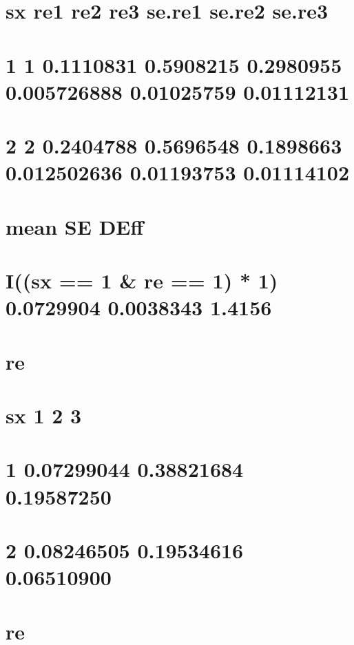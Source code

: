 \documentclass[]{book}
\theoremstyle{definition}
\theoremstyle{definition}
\theoremstyle{definition}
\theoremstyle{remark}
\begin{document}
\section{sx re1 re2 re3 se.re1 se.re2
se.re3}\label{sx-re1-re2-re3-se.re1-se.re2-se.re3}

\section{1 1 0.1110831 0.5908215 0.2980955 0.005726888 0.01025759
0.01112131}\label{section-60}

\section{2 2 0.2404788 0.5696548 0.1898663 0.012502636 0.01193753
0.01114102}\label{section-61}

\section{mean SE DEff}\label{mean-se-deff-1}

\section{I((sx == 1 \& re == 1) * 1) 0.0729904 0.0038343
1.4156}\label{isx-1-re-1-1-0.0729904-0.0038343-1.4156}

\section{re}\label{re-1}

\section{sx 1 2 3}\label{sx-1-2-3-1}

\section{1 0.07299044 0.38821684 0.19587250}\label{section-62}

\section{2 0.08246505 0.19534616 0.06510900}\label{section-63}

\section{re}\label{re-2}
\end{document}
